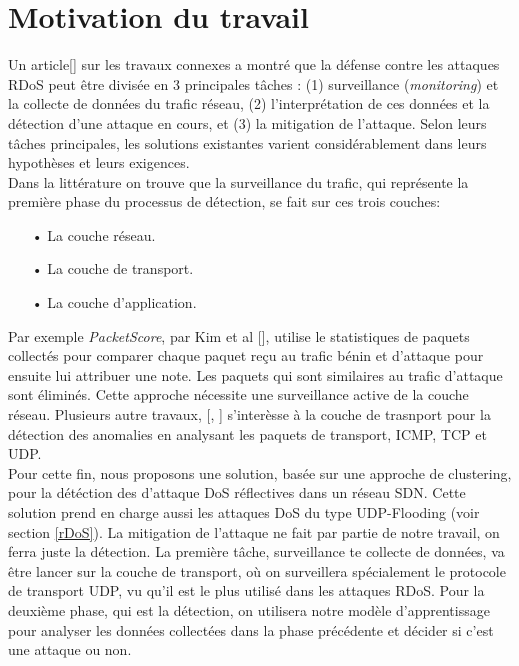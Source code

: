 \section{Motivation du travail}
Un article[\cite{21}] sur les travaux connexes a montré que la défense contre les attaques RDoS peut être divisée en 3 principales tâches : (1) surveillance (\textit{monitoring}) et la collecte de données du trafic réseau, (2) l’interprétation de ces données et la détection d’une attaque en cours, et (3) la mitigation de l’attaque. Selon leurs tâches principales, les solutions existantes varient considérablement dans leurs hypothèses et leurs exigences.\\
Dans la littérature on trouve que la surveillance du trafic, qui représente la première phase du processus de détection, se fait sur ces trois couches:\\
\begin{itemize}
\item[•] La couche réseau.
\item[•] La couche de transport.
\item[•] La couche d'application.\\
\end{itemize}

Par exemple \textit{PacketScore}, par Kim et al [\cite{22}], utilise le statistiques de paquets collectés pour comparer chaque paquet reçu au trafic bénin et d’attaque pour ensuite lui attribuer une note. Les paquets qui sont similaires au trafic d’attaque sont éliminés. Cette approche nécessite une surveillance active de la couche réseau.
Plusieurs autre travaux, [\cite{23}, \cite{24}] s'interèsse à la couche de trasnport pour la détection des anomalies en analysant les paquets de transport, ICMP, TCP et UDP.\\

Pour cette fin, nous proposons une solution, basée sur une approche de clustering, pour la détéction des d'attaque DoS réflectives dans un réseau SDN. Cette solution prend en charge aussi les attaques DoS du type UDP-Flooding (voir section \ref{rDoS}). La mitigation de l'attaque ne fait par partie de notre travail, on ferra juste la détection. La première tâche, surveillance te collecte de données, va être lancer sur la couche de transport, où on surveillera spécialement le protocole de transport UDP, vu qu'il est le plus utilisé dans les attaques RDoS. Pour la deuxième phase, qui est la détection, on utilisera notre modèle d'apprentissage pour analyser les données collectées dans la phase précédente et décider si c'est une attaque ou non.  

